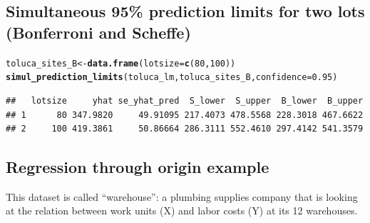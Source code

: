 \documentclass{article}\usepackage[]{graphicx}\usepackage[]{color}
\makeatletter
\newcommand{\hlnum}[1]{\textcolor[rgb]{0.686,0.059,0.569}{#1}}%
\newcommand{\hlstd}[1]{\textcolor[rgb]{0.345,0.345,0.345}{#1}}%
\newcommand{\hlkwb}[1]{\textcolor[rgb]{0.69,0.353,0.396}{#1}}%
\newcommand{\hlkwc}[1]{\textcolor[rgb]{0.333,0.667,0.333}{#1}}%
\newcommand{\hlkwd}[1]{\textcolor[rgb]{0.737,0.353,0.396}{\textbf{#1}}}%
\newenvironment{kframe}{%
 \def\at@end@of@kframe{}%
 \ifinner\ifhmode%
  \def\at@end@of@kframe{\end{minipage}}%
  \begin{minipage}{\columnwidth}%
 \fi\fi%
 \def\FrameCommand##1{\hskip\@totalleftmargin \hskip-\fboxsep
 \colorbox{shadecolor}{##1}\hskip-\fboxsep
     \hskip-\linewidth \hskip-\@totalleftmargin \hskip\columnwidth}%
 \MakeFramed {\advance\hsize-\width
   \@totalleftmargin\z@ \linewidth\hsize
   \@setminipage}}%
 {\par\unskip\endMakeFramed%
 \at@end@of@kframe}
\newenvironment{knitrout}{}{} %
\makeatother
\begin{document}
\subsection*{Simultaneous 95\% prediction limits for two lots (Bonferroni and Scheffe)}
\begin{knitrout}
\color{fgcolor}\begin{kframe}
\begin{alltt}
\hlstd{toluca_sites_B} \hlkwb{<-} \hlkwd{data.frame}\hlstd{(}\hlkwc{lotsize} \hlstd{=} \hlkwd{c}\hlstd{(}\hlnum{80}\hlstd{,} \hlnum{100}\hlstd{))}
\hlkwd{simul_prediction_limits}\hlstd{(toluca_lm, toluca_sites_B,} \hlkwc{confidence} \hlstd{=} \hlnum{0.95}\hlstd{)}
\end{alltt}
\begin{verbatim}
##   lotsize     yhat se_yhat_pred  S_lower  S_upper  B_lower  B_upper
## 1      80 347.9820     49.91095 217.4073 478.5568 228.3018 467.6622
## 2     100 419.3861     50.86664 286.3111 552.4610 297.4142 541.3579
\end{verbatim}
\end{kframe}
\end{knitrout}

\medskip
\hline
\medskip

\subsection*{Regression through origin example}

This dataset is called ``warehouse'': a plumbing supplies company that is looking at the relation between work units (X) and labor costs (Y) at its 12 warehouses.
\end{document}
